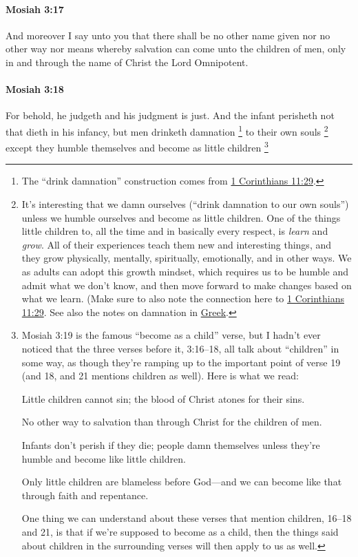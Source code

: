 		\paragraph{Mosiah 3:17} %
			\label{MOSIAH-3-17}

			And moreover I say unto you
			that there shall be no other name given nor no other way nor means
			whereby salvation can come unto the children of men,
			only in and through the name of Christ the Lord Omnipotent.

		\paragraph{Mosiah 3:18} %
			\label{MOSIAH-3-18}

			For behold, he judgeth and his judgment is just.
			And the infant perisheth not that dieth in his infancy,
			but men drinketh damnation%
				\footnote{%
					The ``drink damnation'' construction comes from \hyperref[1CORINTHIANS-11-29]{1 Corinthians 11:29}.
					}
			to their own souls%
				\footnote{%
					\label{MOSIAH-3-18-NOTE-damnation}%
					It's interesting that we damn ourselves (``drink damnation to our own souls'') unless we humble ourselves and become as little children. One of the things little children to, all the time and in basically every respect, is \textit{learn} and \textit{grow}. All of their experiences teach them new and interesting things, and they grow physically, mentally, spiritually, emotionally, and in other ways. We as adults can adopt this growth mindset, which requires us to be humble and admit what we don't know, and then move forward to make changes based on what we learn. (Make sure to also note the connection here to \hyperref[1CORINTHIANS-11-29]{1 Corinthians 11:29}. See also the notes on damnation in \hyperref[DAMNATION-GREEK]{Greek}.
					} 
			except they humble themselves and become as little children%
				\footnote{%
					\label{MOSIAH-3-18-NOTE-children}%
					Mosiah 3:19 is the famous ``become as a child'' verse, but I hadn't ever noticed that the three verses before it, 3:16--18, all talk about ``children'' in some way, as though they're ramping up to the important point of verse 19 (and 18, and 21 mentions children as well). Here is what we read:
						\begin{compactdesc}
							\item[Mosiah 3:16] Little children cannot sin; the blood of Christ atones for their sins.
							\item[Mosiah 3:17] No other way to salvation than through Christ for the children of men.
							\item[Mosiah 3:18] Infants don't perish if they die; people damn themselves unless they're humble and become like little children.
							\item[Mosiah 3:21] Only little children are blameless before God---and we can become like that through faith and repentance.
						\end{compactdesc}
					One thing we can understand about these verses that mention children, 16--18 and 21, is that if we're supposed to become as a child, then the things said about children in the surrounding verses will then apply to us as well. 
					}
